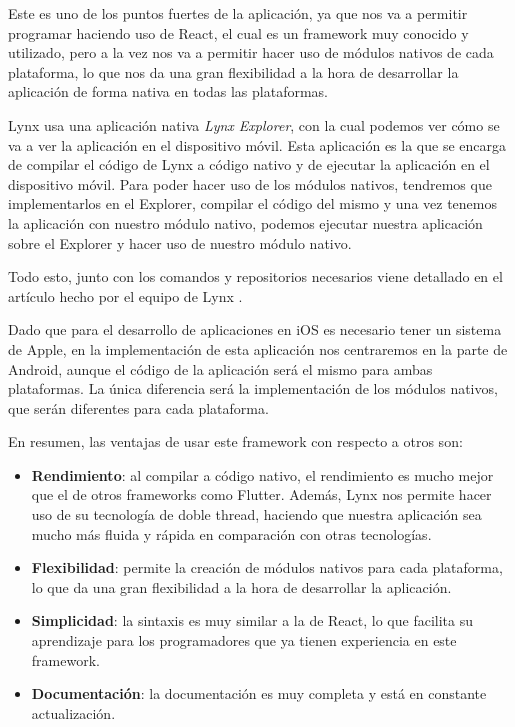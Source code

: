 Este es uno de los puntos fuertes de la aplicación, ya que nos va a permitir programar haciendo uso de React, el cual es un framework muy conocido y utilizado, pero a la vez nos va a permitir hacer uso de módulos nativos de cada plataforma, lo que nos da una gran flexibilidad a la hora de desarrollar la aplicación de forma nativa en todas las plataformas.

Lynx usa una aplicación nativa \textit{Lynx Explorer}, con la cual podemos ver cómo se va a ver la aplicación en el dispositivo móvil. Esta aplicación es la que se encarga de compilar el código de Lynx a código nativo y de ejecutar la aplicación en el dispositivo móvil.
Para poder hacer uso de los módulos nativos, tendremos que implementarlos en el Explorer, compilar el código del mismo y una vez tenemos la aplicación con nuestro módulo nativo, podemos ejecutar nuestra aplicación sobre el Explorer y hacer uso de nuestro módulo nativo.

Todo esto, junto con los comandos y repositorios necesarios viene detallado en el artículo hecho por el equipo de Lynx \parencite{lynx-native-modules}.

Dado que para el desarrollo de aplicaciones en iOS es necesario tener un sistema de Apple, en la implementación de esta aplicación nos centraremos en la parte de Android, aunque el código de la aplicación será el mismo para ambas plataformas.
La única diferencia será la implementación de los módulos nativos, que serán diferentes para cada plataforma.

En resumen, las ventajas de usar este framework con respecto a otros son:
\begin{itemize}
    \item \textbf{Rendimiento}: al compilar a código nativo, el rendimiento es mucho mejor que el de otros frameworks como Flutter. Además, Lynx nos permite hacer uso de su tecnología de doble thread, haciendo que nuestra aplicación sea mucho más fluida y rápida en comparación con otras tecnologías.
    \item \textbf{Flexibilidad}: permite la creación de módulos nativos para cada plataforma, lo que da una gran flexibilidad a la hora de desarrollar la aplicación.
    \item \textbf{Simplicidad}: la sintaxis es muy similar a la de React, lo que facilita su aprendizaje para los programadores que ya tienen experiencia en este framework.
    \item \textbf{Documentación}: la documentación es muy completa y está en constante actualización.
\end{itemize}

